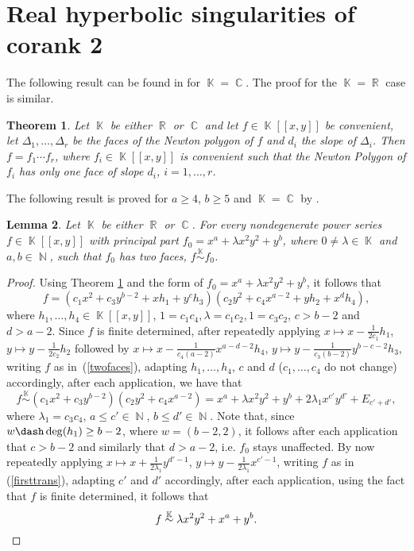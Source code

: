 \documentclass[noend]{amsproc}
\newtheorem{theorem}{Theorem}
\newtheorem{lemma}[theorem]{Lemma}
\theoremstyle{definition}
\DeclareMathOperator{\N}{\mathbb{N}}
\DeclareMathOperator{\R}{\mathbb{R}}
\DeclareMathOperator{\C}{\mathbb{C}}
\DeclareMathOperator{\K}{\mathbb{K}}
\begin{document}
\section{Real hyperbolic singularities of corank 2}
The following result can be found in \citet{PdJ2000} for $\K=\C$. The proof for
the $\K=\R$ case is similar.

\begin{theorem}\label{faces}
Let $\K$ be either $\R$ or $\C$ and let $f\in\K[[x,y]]$ be convenient, let
$\Delta_1,\ldots,\Delta_r$ be the faces of the Newton polygon of $f$ and $d_i$
the slope of $\Delta_i$. Then $f=f_1\cdots f_r$, where $f_i\in\K[[x,y]]$ is
convenient such that the Newton Polygon of $f_i$ has only one face of slope
$d_i$, $i=1,\ldots,r$.
\end{theorem}

The following result is proved for $a\ge 4$, $b\ge 5$ and $\K=\C$ by
\citet{A1974}.

\begin{lemma}\label{principalpart}
Let $\K$ be either $\R$ or $\C$. For every nondegenerate power series
$f\in\K[[x,y]]$ with principal part $f_0=x^a+\lambda x^2y^2+y^b$, where
$0\neq\lambda\in\K$ and $a,b\in\N$, such that $f_0$ has two faces,
$f\overset{\K}\sim f_0$.
\end{lemma}
\begin{proof}
Using Theorem \ref{faces} and the form of $f_0=x^a+\lambda x^2y^2+y^b$, it
follows that
\begin{equation}\label{twofaces}
f=(c_1x^2+c_3y^{b-2}+xh_1+y^ch_3)(c_2y^2+c_4x^{a-2}+yh_2+x^dh_4),
\end{equation}
where $h_1,\ldots,h_4\in\K[[x,y]]$, $1=c_1c_4, \lambda=c_1c_2, 1=c_3c_2$,
$c>b-2$ and $d>a-2$. Since $f$ is finite determined, after repeatedly applying
$x\mapsto x-\frac{1}{2c_1}h_1$, $y\mapsto y-\frac{1}{2c_2}h_2$ followed by
$x\mapsto x-\frac{1}{c_4(a-2)}x^{a-d-2}h_4$,
$y\mapsto y-\frac{1}{c_3(b-2)}y^{b-c-2} h_3$, writing $f$ as
in~(\ref{twofaces}), adapting $h_1,\ldots,h_4$, $c$ and $d$ ($c_1,\ldots,c_4$
do not change) accordingly, after each application, we have that
\begin{equation}
f\overset{\K}\sim (c_1x^2+c_3y^{b-2})(c_2y^2+c_4x^{a-2})
=x^a+\lambda x^2y^2+y^b+2\lambda_1x^{c'}y^{d'}+E_{c'+d'},\label{firsttrans}
\end{equation}
where $\lambda_1=c_3c_4$, $a\le c'\in\N$, $b\le d'\in\N$. Note that, since
$w\dash\deg(h_1)\ge b-2$, where $w=(b-2,2)$, it follows after each application
that $c>b-2$ and similarly that $d>a-2$, i.e. $f_0$ stays unaffected. By now
repeatedly applying $x\mapsto x+\frac{1}{2\lambda_1}y^{d'-1}$,
$y\mapsto y-\frac{1}{2\lambda_1}x^{c'-1}$, writing $f$ as in
(\ref{firsttrans}), adapting $c'$ and $d'$ accordingly, after each application,
using the fact that $f$ is finite determined, it follows that
\[f\overset{\K}\sim \lambda x^2y^2+x^a+y^b.\qedhere\]
\end{proof}
\end{document}
